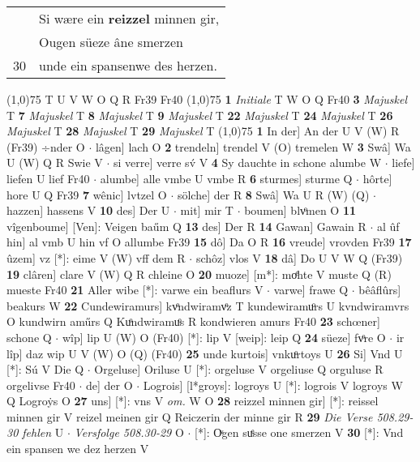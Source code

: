 \documentclass[8pt,a4paper,notitlepage]{article}
\begin{document}
\begin{table}[ht]
\begin{minipage}[t]{0.5\linewidth}
\begin{tabular}{rl}
 & Si wære ein \textbf{reizzel} minnen gir,\\ 
 & Ougen süeze âne smerzen\\ 
30 & unde ein spansenwe des herzen.\\ 
\end{tabular}
\scriptsize
\line(1,0){75} \newline
T U V W O Q R Fr39 Fr40 \newline
\line(1,0){75} \newline
\textbf{1} \textit{Initiale} T W O Q Fr40  \textbf{3} \textit{Majuskel} T  \textbf{7} \textit{Majuskel} T  \textbf{8} \textit{Majuskel} T  \textbf{9} \textit{Majuskel} T  \textbf{22} \textit{Majuskel} T  \textbf{24} \textit{Majuskel} T  \textbf{26} \textit{Majuskel} T  \textbf{28} \textit{Majuskel} T  \textbf{29} \textit{Majuskel} T  \newline
\line(1,0){75} \newline
\textbf{1} In der] An der U V (W) R (Fr39) ÷nder O  $\cdot$ lâgen] lach O \textbf{2} trendeln] trendel V (O) tremelen W \textbf{3} Swâ] Wa U (W) Q R Swie V  $\cdot$ si verre] verre sv́ V \textbf{4} Sy dauchte in schone alumbe W  $\cdot$ liefe] liefen U lief Fr40  $\cdot$ alumbe] alle vmbe U vmbe R \textbf{6} sturmes] sturme Q  $\cdot$ hôrte] hore U Q Fr39 \textbf{7} wênic] lvtzel O  $\cdot$ sölche] der R \textbf{8} Swâ] Wa U R (W) (Q)  $\cdot$ hazzen] hassens V \textbf{10} des] Der U  $\cdot$ mit] mir T  $\cdot$ boumen] blvͦmen O \textbf{11} vîgenboume] [Ven]: Veigen baűm Q \textbf{13} des] Der R \textbf{14} Gawan] Gawain R  $\cdot$ al ûf hin] al vmb U hin vf O allumbe Fr39 \textbf{15} dô] Da O R \textbf{16} vreude] vrovden Fr39 \textbf{17} ûzem] vz [*]: eime V (W) vff dem R  $\cdot$ schôz] vlos V \textbf{18} dâ] Do U V W Q (Fr39) \textbf{19} clâren] clare V (W) Q R chleine O \textbf{20} muoze] [m*]: moͤhte V muste Q (R) mueste Fr40 \textbf{21} Aller wibe [*]: varwe ein beaflurs V  $\cdot$ varwe] frawe Q  $\cdot$ bêâflûrs] beakurs W \textbf{22} Cundewiramurs] kvͦndwiramvͦz T kundewiramuͦrs U kvndwiramvrs O kundwirn aműrs Q Kuͦndwiramuͦs R kondwieren amurs Fr40 \textbf{23} schœner] schone Q  $\cdot$ wîp] lip U (W) O (Fr40) [*]: lip  V [weip]: leip Q \textbf{24} süeze] fvͦre O  $\cdot$ ir lîp] daz wip U V (W) O (Q) (Fr40) \textbf{25} unde kurtois] vnkuͦrtoys U \textbf{26} Si] Vnd U [*]: Sú V Die Q  $\cdot$ Orgeluse] Oriluse U [*]: orgeluse V orgeliuse Q orguluse R orgelivse Fr40  $\cdot$ de] der O  $\cdot$ Logrois] [l*groys]: logroys U [*]: logrois V logroys W Q Logroẏs O \textbf{27} uns] [*]: vns V \textit{om.} W O \textbf{28} reizzel minnen gir] [*]: reissel minnen gir V reizel meinen gir Q Reiczerin der minne gir R \textbf{29} \textit{Die Verse 508.29-30 fehlen} U   $\cdot$ \textit{Versfolge 508.30-29} O   $\cdot$ [*]: Oͮgen suͤsse one smerzen V \textbf{30} [*]: Vnd ein spansen we dez herzen V \newline
\end{minipage}
\end{table}
\end{document}
